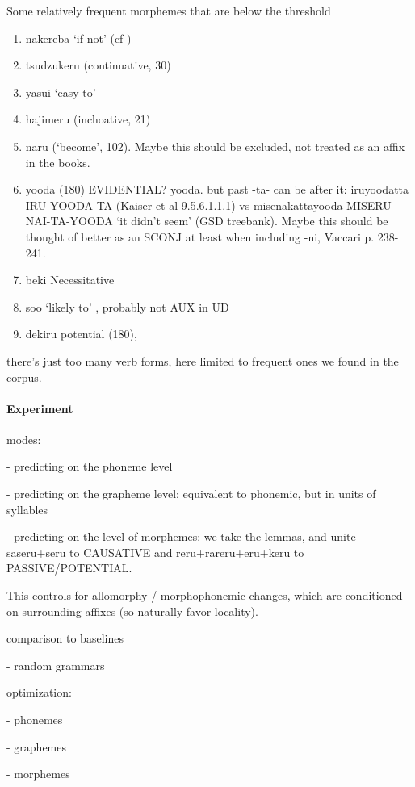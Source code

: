 Some relatively frequent morphemes that are below the threshold

\begin{enumerate}
\item nakereba `if not' (cf \cite[9.3.1.4]{kaiser2013japanese})
\item tsudzukeru (continuative, 30)
\item yasui `easy to'
\item hajimeru (inchoative, 21)
\item naru (`become', 102). Maybe this should be excluded, not treated as an affix in the books.
\item yooda (180) EVIDENTIAL? yooda. but past -ta- can be after it: iruyoodatta IRU-YOODA-TA (Kaiser et al 9.5.6.1.1.1) vs misenakattayooda MISERU-NAI-TA-YOODA `it didn't seem' (GSD treebank). Maybe this should be thought of better as an SCONJ at least when including -ni, Vaccari p. 238-241.
\item beki Necessitative \cite[248]{kaiser2013japanese}
\item soo `likely to' \cite[258]{kaiser2013japanese}, probably not AUX in UD
\item dekiru potential (180), 
\end{enumerate}


there's just too many verb forms, here limited to frequent ones we found in the corpus.


\paragraph{Experiment}

modes:

- predicting on the phoneme level

- predicting on the grapheme level: equivalent to phonemic, but in units of syllables

- predicting on the level of morphemes: we take the lemmas, and unite saseru+seru to CAUSATIVE and reru+rareru+eru+keru to PASSIVE/POTENTIAL.

This controls for allomorphy / morphophonemic changes, which are conditioned on surrounding affixes (so naturally favor locality).


comparison to baselines

- random grammars

optimization:

- phonemes

- graphemes

- morphemes



